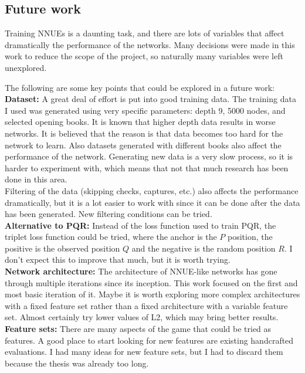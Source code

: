 \newpage
\subsection{Future work}

Training NNUEs is a daunting task, and there are lots of variables that affect dramatically the performance of the networks. Many decisions were made in this work to reduce the scope of the project, so naturally many variables were left unexplored.

The following are some key points that could be explored in a future work: \\

\textbf{Dataset:} A great deal of effort is put into good training data. The training data I used was generated using very specific parameters: depth 9, 5000 nodes, and selected opening books. It is known that higher depth data results in worse networks. It is believed that the reason is that data becomes too hard for the network to learn. Also datasets generated with different books also affect the performance of the network.  Generating new data is a very slow process, so it is harder to experiment with, which means that not that much research has been done in this area. \\
Filtering of the data (skipping checks, captures, etc.) also affects the performance dramatically, but it is a lot easier to work with since it can be done after the data has been generated. New filtering conditions can be tried. \\

\textbf{Alternative to PQR:} Instead of the loss function used to train PQR, the triplet loss function could be tried, where the anchor is the $P$ position, the positive is the observed position $Q$ and the negative is the random position $R$. I don't expect this to improve that much, but it is worth trying. \\

\textbf{Network architecture:} The architecture of NNUE-like networks has gone through multiple iterations since its inception. This work focused on the first and most basic iteration of it. Maybe it is worth exploring more complex architectures with a fixed feature set rather than a fixed architecture with a variable feature set.
Almost certainly try lower values of L2, which may bring better results. \\

\textbf{Feature sets:} There are many aspects of the game that could be tried as features. A good place to start looking for new features are existing handcrafted evaluations. I had many ideas for new feature sets, but I had to discard them because the thesis was already too long.
